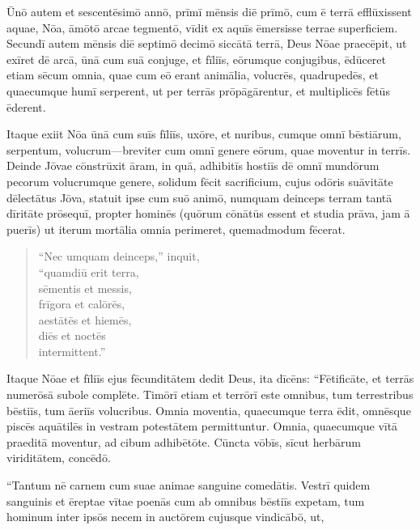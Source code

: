 \Versus Ūnō autem et sescentēsimō annō, prīmī mēnsis diē prīmō, cum ē terrā efflūxissent aquae, Nōa, āmōtō arcae tegmentō, vīdit ex aquīs ēmersisse terrae superficiem.
\Versus Secundī autem mēnsis diē septimō decimō siccātā terrā,
\Versus Deus Nōae praecēpit, ut exīret dē arcā,
\Versus ūnā cum suā conjuge, et fīliīs, eōrumque conjugibus,
\Versus ēdūceret etiam sēcum omnia, quae cum eō erant animālia, volucrēs, quadrupedēs, et quaecumque humī serperent, ut per terrās prōpāgārentur, et multiplicēs fētūs ēderent.

\Versus Itaque exiit Nōa ūnā cum suīs fīliīs, uxōre, et nuribus,
\Versus cumque omnī bēstiārum, serpentum, volucrum—breviter cum omnī genere eōrum, quae moventur in terrīs.
\Versus Deinde Jōvae cōnstrūxit āram, in quā, adhibitīs hostiīs dē omnī mundōrum pecorum volucrumque genere, solidum fēcit sacrificium,
\Versus cujus odōris suāvitāte dēlectātus Jōva, statuit ipse cum suō animō, numquam deinceps terram tantā dīritāte prōsequī, propter hominēs (quōrum cōnātūs essent et studia prāva, jam ā puerīs) ut iterum mortālia omnia perimeret, quemadmodum fēcerat.

\begin{verse}
\begin{patverse*}
\Versus ``Nec umquam deinceps,'' inquit,\\
``quamdiū erit terra,\\
sēmentis et messis,\\
frīgora et calōrēs,\\
aestātēs et hiemēs,\\
diēs et noctēs\\
intermittent.''
\end{patverse*}
\end{verse}



\Caput
\Versus Itaque Nōae et fīliīs ejus fēcunditātem dedit Deus, ita dīcēns: ``Fētificāte, et terrās numerōsā subole complēte.
\Versus Timōrī etiam et terrōrī este omnibus, tum terrestribus bēstiīs, tum āeriīs volucribus. Omnia moventia, quaecumque terra ēdit, omnēsque piscēs aquātilēs in vestram potestātem permittuntur.
\Versus Omnia, quaecumque vītā praeditā moventur, ad cibum adhibētōte. Cūncta vōbīs, sīcut herbārum viriditātem, concēdō.

\Versus ``Tantum nē carnem cum suae animae sanguine comedātis.
\Versus Vestrī quidem sanguinis et ēreptae vītae poenās cum ab omnibus bēstiīs expetam, tum hominum inter ipsōs necem in auctōrem cujusque vindicābō,
\Versus ut,

